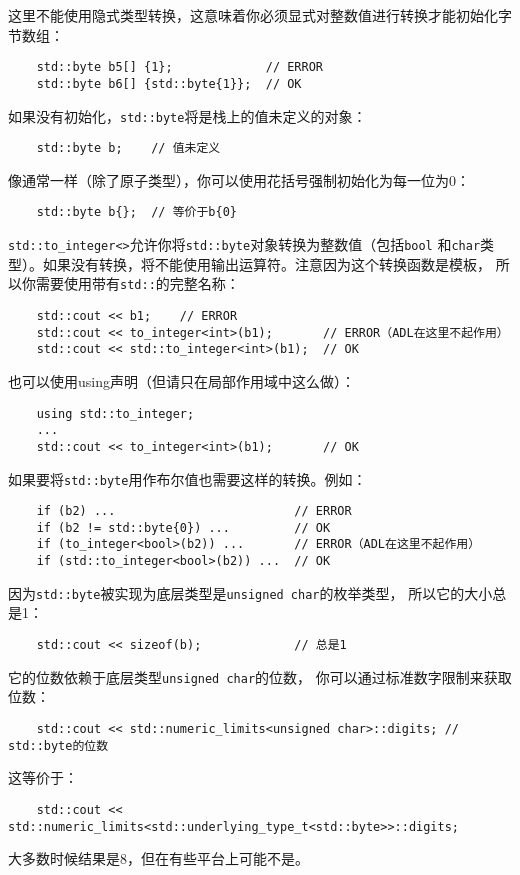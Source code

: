 这里不能使用隐式类型转换，这意味着你必须显式对整数值进行转换才能初始化字节数组：
\begin{lstlisting}
    std::byte b5[] {1};             // ERROR
    std::byte b6[] {std::byte{1}};  // OK
\end{lstlisting}
如果没有初始化，\texttt{std::byte}将是栈上的值未定义的对象：
\begin{lstlisting}
    std::byte b;    // 值未定义
\end{lstlisting}
像通常一样（除了原子类型），你可以使用花括号强制初始化为每一位为0：
\begin{lstlisting}
    std::byte b{};  // 等价于b{0}
\end{lstlisting}
\texttt{std::to\_integer<>}允许你将\texttt{std::byte}对象转换为整数值（包括\texttt{bool}
和\texttt{char}类型）。如果没有转换，将不能使用输出运算符。注意因为这个转换函数是模板，
所以你需要使用带有\texttt{std::}的完整名称：
\begin{lstlisting}
    std::cout << b1;    // ERROR
    std::cout << to_integer<int>(b1);       // ERROR（ADL在这里不起作用）
    std::cout << std::to_integer<int>(b1);  // OK
\end{lstlisting}
也可以使用using声明（但请只在局部作用域中这么做）：
\begin{lstlisting}
    using std::to_integer;
    ...
    std::cout << to_integer<int>(b1);       // OK
\end{lstlisting}
如果要将\texttt{std::byte}用作布尔值也需要这样的转换。例如：
\begin{lstlisting}
    if (b2) ...                         // ERROR
    if (b2 != std::byte{0}) ...         // OK
    if (to_integer<bool>(b2)) ...       // ERROR（ADL在这里不起作用）
    if (std::to_integer<bool>(b2)) ...  // OK
\end{lstlisting}
因为\texttt{std::byte}被实现为底层类型是\texttt{unsigned char}的枚举类型，
所以它的大小总是1：
\begin{lstlisting}
    std::cout << sizeof(b);             // 总是1
\end{lstlisting}
它的位数依赖于底层类型\texttt{unsigned char}的位数，
你可以通过标准数字限制来获取位数：
\begin{lstlisting}
    std::cout << std::numeric_limits<unsigned char>::digits; // std::byte的位数
\end{lstlisting}
这等价于：
\begin{lstlisting}
    std::cout << std::numeric_limits<std::underlying_type_t<std::byte>>::digits;
\end{lstlisting}
大多数时候结果是8，但在有些平台上可能不是。


